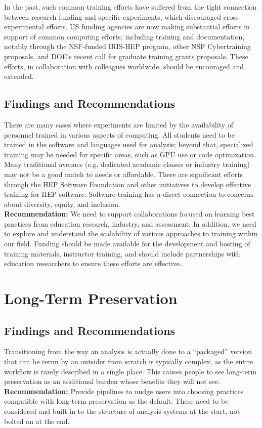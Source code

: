 In the past, such common training efforts have suffered from the  tight connection between research funding and specific experiments, which discouraged cross-experimental efforts. US funding agencies are now making substantial efforts in support of common computing efforts, including training and documentation, notably through the NSF-funded IRIS-HEP program, other NSF Cybertraining proposals, and DOE's recent call for graduate training grants proposals. These efforts, in collaboration with colleagues worldwide, should be encouraged and extended.



\subsection{Findings and Recommendations}
There are many cases where experiments are limited by the availability of personnel trained in various aspects of computing. All students need to be trained in the software and languages used for analysis; beyond that, specialized training may be needed for specific areas, such as GPU use or code optimization. Many traditional avenues (e.g. dedicated academic classes or industry training) may not be a good match to needs or affordable. There are significant efforts through the HEP Software Foundation and other initiatives to develop effective training for HEP software. Software training has a direct connection to concerns about diversity, equity, and inclusion.\\
\textbf{Recommendation:}  We need to support collaborations focused on learning best practices from education research, industry, and assessment. In addition, we need to explore and understand the scalability of various approaches to training within our field.  Funding should be made available for the development and hosting of training materials, instructor training, and should include partnerships with education researchers to ensure these efforts are effective.

\section{Long-Term Preservation}
\subsection{Findings and Recommendations}
Transitioning from the way an analysis is actually done to a “packaged” version that can be rerun by an outsider from scratch is typically complex, as the entire workflow is rarely described in a single place. This causes people to see long-term preservation as an additional burden whose benefits they will not see.\\
\textbf{Recommendation:} Provide pipelines to nudge users into choosing practices compatible with long-term preservation as the default. These need to be considered and built in to the structure of analysis systems at the start, not bolted on at the end.


